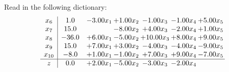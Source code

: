 \documentclass[9pt]{article}
\begin{document}
Read in the following dictionary:
\[\begin{array}{c| c c@{\hskip 2pt} c@{\hskip 2pt} c@{\hskip 2pt} c@{\hskip 2pt} c@{\hskip 2pt} }
 x_{6}   &  1.0 & -3.00 x_{1} & +  1.00 x_{2} & -1.00 x_{3} & -1.00 x_{4} & +  5.00 x_{5}\\
 x_{7}   &  15.0  &   & -8.00 x_{2} & +  4.00 x_{3} & -2.00 x_{4} & +  1.00 x_{5}\\
 x_{8}   &  -36.0 & +  6.00 x_{1} & -5.00 x_{2} & + 10.00 x_{3} & +  8.00 x_{4} & +  9.00 x_{5}\\
 x_{9}   &  15.0 & +  7.00 x_{1} & +  3.00 x_{2} & -4.00 x_{3} & -4.00 x_{4} & -9.00 x_{5}\\
 x_{10}   &  -8.0 & +  1.00 x_{1} & -1.00 x_{2} & +  7.00 x_{3} & +  9.00 x_{4} & -7.00 x_{5}\\
\hline
z    &  0.0 & +  2.00 x_{1} & -5.00 x_{2} & -3.00 x_{3} & -2.00 x_{4} &   \\
\end{array}\]
\end{document}
